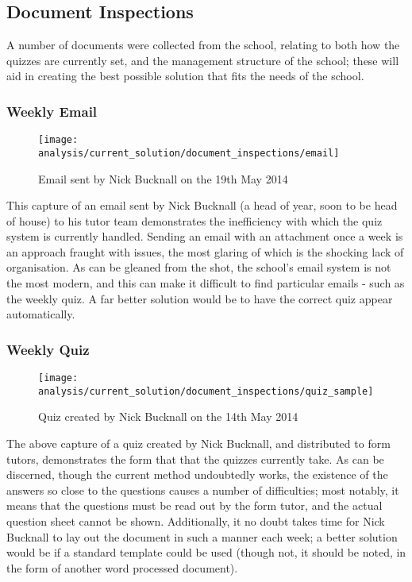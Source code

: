 \subsection{Document Inspections}

A number of documents were collected from the school, relating to both how the quizzes are currently set, and the management structure of the school; these will aid in creating the best possible solution that fits the needs of the school.

\subsubsection{Weekly Email} %
\label{ssub:weekly_email}
\begin{figure}[h!]
  \texttt{[image: analysis/current\_solution/document\_inspections/email]}
  \caption{Email sent by Nick Bucknall on the 19th May 2014}
\end{figure}

This capture of an email sent by Nick Bucknall (a head of year, soon to be head of house) to his tutor team demonstrates the inefficiency with which the quiz system is currently handled. Sending an email with an attachment once a week is an approach fraught with issues, the most glaring of which is the shocking lack of organisation. As can be gleaned from the shot, the school's email system is not the most modern, and this can make it difficult to find particular emails - such as the weekly quiz. A far better solution would be to have the correct quiz appear automatically.
\clearpage

\subsubsection{Weekly Quiz} %
\label{ssub:weekly_quiz}
\begin{figure}[h!]
  \texttt{[image: analysis/current\_solution/document\_inspections/quiz\_sample]}
  \caption{Quiz created by Nick Bucknall on the 14th May 2014}
\end{figure}

The above capture of a quiz created by Nick Bucknall, and distributed to form tutors, demonstrates the form that that the quizzes currently take. As can be discerned, though the current method undoubtedly works, the existence of the answers so close to the questions causes a number of difficulties; most notably, it means that the questions must be read out by the form tutor, and the actual question sheet cannot be shown. Additionally, it no doubt takes time for Nick Bucknall to lay out the document in such a manner each week; a better solution would be if a standard template could be used (though not, it should be noted, in the form of another word processed document).
\clearpage

